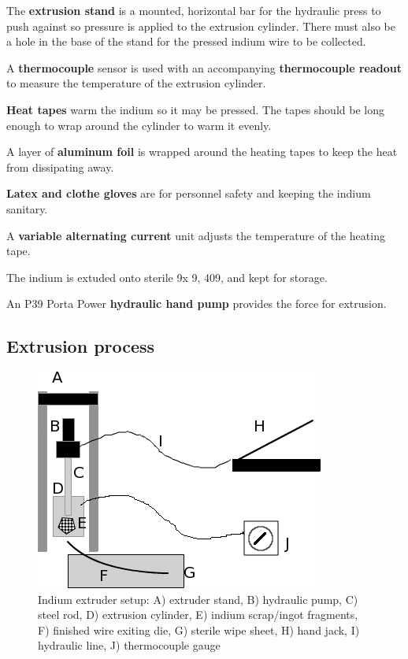 The \textbf{extrusion stand} is a mounted, horizontal bar for the hydraulic press to push against so pressure is applied to the extrusion cylinder.  There must also be a hole in the base of the stand for the pressed indium wire to be collected.

A \textbf{thermocouple} sensor is used with an accompanying \textbf{thermocouple readout} to measure the temperature of the extrusion cylinder.

\textbf{Heat tapes} warm the indium so it may be pressed.  The tapes should be long enough to wrap around the cylinder to warm it evenly.

A layer of \textbf{aluminum foil} is wrapped around the heating tapes to keep the heat from dissipating away.

\textbf{Latex and clothe gloves} are for personnel safety and keeping the indium sanitary.

A \textbf{variable alternating current} unit adjusts the temperature of the heating tape.

The indium is extuded onto sterile \textbf{} 9\inches x 9\inches, 409, and kept for storage.

An  P39 Porta Power \textbf{hydraulic hand pump} provides the force for extrusion.

\subsection{Extrusion process}

\begin{figure}
 \centering
 \includegraphics[scale=0.5]{img/extruder-setup.png}
 \caption{Indium extruder setup: A) extruder stand, B) hydraulic pump, C) steel rod, D) extrusion cylinder, E) indium scrap/ingot fragments, F) finished wire exiting die, G) sterile wipe sheet, H) hand jack, I) hydraulic line, J) thermocouple gauge}
 \label{fig:extruder}
\end{figure}

